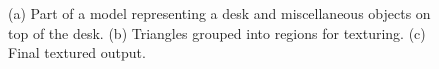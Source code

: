 \documentclass[]{spie}  %
\begin{document}
\begin{figure}
  \centering
  \caption{(a) Part of a model representing a desk and miscellaneous
    objects on top of the desk. (b) Triangles grouped into regions for
    texturing. (c) Final textured output.}
  \label{fig:deskGeom}
\end{figure}
\end{document}
